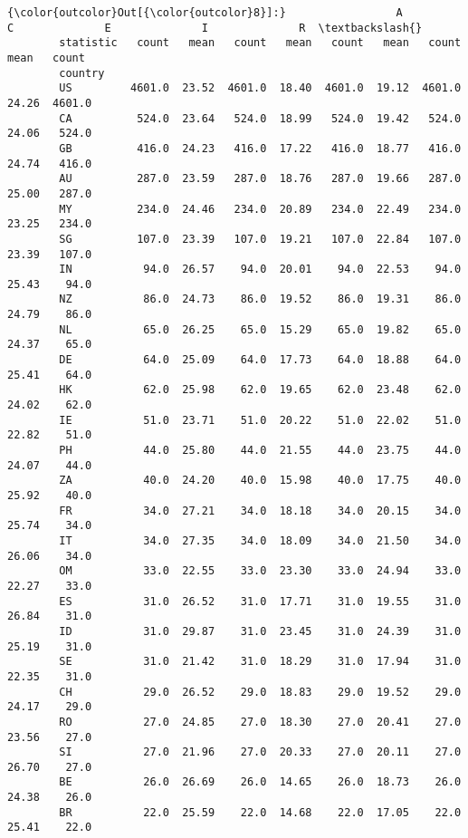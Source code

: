 \documentclass[11pt]{article}
\begin{document}
            \begin{Verbatim}[commandchars=\\\{\}]
{\color{outcolor}Out[{\color{outcolor}8}]:}                 A              C              E              I              R  \textbackslash{}
        statistic   count   mean   count   mean   count   mean   count   mean   count   
        country                                                                         
        US         4601.0  23.52  4601.0  18.40  4601.0  19.12  4601.0  24.26  4601.0   
        CA          524.0  23.64   524.0  18.99   524.0  19.42   524.0  24.06   524.0   
        GB          416.0  24.23   416.0  17.22   416.0  18.77   416.0  24.74   416.0   
        AU          287.0  23.59   287.0  18.76   287.0  19.66   287.0  25.00   287.0   
        MY          234.0  24.46   234.0  20.89   234.0  22.49   234.0  23.25   234.0   
        SG          107.0  23.39   107.0  19.21   107.0  22.84   107.0  23.39   107.0   
        IN           94.0  26.57    94.0  20.01    94.0  22.53    94.0  25.43    94.0   
        NZ           86.0  24.73    86.0  19.52    86.0  19.31    86.0  24.79    86.0   
        NL           65.0  26.25    65.0  15.29    65.0  19.82    65.0  24.37    65.0   
        DE           64.0  25.09    64.0  17.73    64.0  18.88    64.0  25.41    64.0   
        HK           62.0  25.98    62.0  19.65    62.0  23.48    62.0  24.02    62.0   
        IE           51.0  23.71    51.0  20.22    51.0  22.02    51.0  22.82    51.0   
        PH           44.0  25.80    44.0  21.55    44.0  23.75    44.0  24.07    44.0   
        ZA           40.0  24.20    40.0  15.98    40.0  17.75    40.0  25.92    40.0   
        FR           34.0  27.21    34.0  18.18    34.0  20.15    34.0  25.74    34.0   
        IT           34.0  27.35    34.0  18.09    34.0  21.50    34.0  26.06    34.0   
        OM           33.0  22.55    33.0  23.30    33.0  24.94    33.0  22.27    33.0   
        ES           31.0  26.52    31.0  17.71    31.0  19.55    31.0  26.84    31.0   
        ID           31.0  29.87    31.0  23.45    31.0  24.39    31.0  25.19    31.0   
        SE           31.0  21.42    31.0  18.29    31.0  17.94    31.0  22.35    31.0   
        CH           29.0  26.52    29.0  18.83    29.0  19.52    29.0  24.17    29.0   
        RO           27.0  24.85    27.0  18.30    27.0  20.41    27.0  23.56    27.0   
        SI           27.0  21.96    27.0  20.33    27.0  20.11    27.0  26.70    27.0   
        BE           26.0  26.69    26.0  14.65    26.0  18.73    26.0  24.38    26.0   
        BR           22.0  25.59    22.0  14.68    22.0  17.05    22.0  25.41    22.0   

\end{Verbatim}
\end{document}
